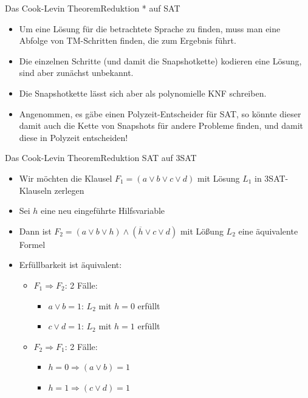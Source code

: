 \documentclass[ignorenonframetext,]{beamer}
\begin{document}
\begin{frame}{Das Cook-Levin Theorem}{Reduktion * auf SAT}

\begin{itemize}
\itemsep1pt\parskip0pt
\item
  Um eine Lösung für die betrachtete Sprache zu finden, muss man eine
  Abfolge von TM-Schritten finden, die zum Ergebnis führt.
\item
  Die einzelnen Schritte (und damit die Snapshotkette) kodieren eine
  Lösung, sind aber zunächst unbekannt.
\item
  Die Snapshotkette lässt sich aber als polynomielle KNF schreiben.
\item
  Angenommen, es gäbe einen Polyzeit-Entscheider für SAT, so könnte
  dieser damit auch die Kette von Snapshots für andere Probleme finden,
  und damit diese in Polyzeit entscheiden!
\end{itemize}

\end{frame}

\begin{frame}{Das Cook-Levin Theorem}{Reduktion SAT auf 3SAT}

\begin{itemize}
\itemsep1pt\parskip0pt
\item
  Wir möchten die Klausel $F_1 = (a \vee b \vee c \vee d)$ mit Lösung
  $L_1$ in 3SAT-Klauseln zerlegen
\item
  Sei $h$ eine neu eingeführte Hilfsvariable
\item
  Dann ist $F_2 = (a \vee b \vee h) \wedge (\overline{h} \vee c \vee d)$
  mit Lößung $L_2$ eine äquivalente Formel
\item
  Erfüllbarkeit ist äquivalent:

  \begin{itemize}
  \itemsep1pt\parskip0pt
  \item
    $F_1 \Rightarrow F_2$: 2 Fälle:

    \begin{itemize}
    \itemsep1pt\parskip0pt
    \item
      $a \vee b = 1$: $L_2$ mit $h = 0$ erfüllt
    \item
      $c \vee d = 1$: $L_2$ mit $h = 1$ erfüllt
    \end{itemize}
  \item
    $F_2 \Rightarrow F_1$: 2 Fälle:

    \begin{itemize}
    \itemsep1pt\parskip0pt
    \item
      $h = 0 \Rightarrow (a \vee b) = 1$
    \item
      $h = 1 \Rightarrow (c \vee d) = 1$
    \end{itemize}
  \end{itemize}
\end{itemize}

\end{frame}
\end{document}
